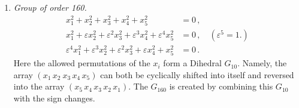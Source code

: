 \documentclass[leqno]{article}
\begin{document}
\begin{enumerate}[label=\arabic*)]
    \item \textit{Group of order 160.}
    \begin{align*}
    	x_1^2 + x_2^2 + x_3^2 + x_4^2 + x_5^2 &= 0 \, , \\
    	x_1^2 + \varepsilon x_2^2 + \varepsilon^2 x_3^2 + \varepsilon^3 x_4^2 + \varepsilon^4 x_5^2 &= 0 \, , \quad (\varepsilon^5=1.) \\
    	\varepsilon^4 x_1^2 + \varepsilon^3 x_2^2 + \varepsilon^2 x_3^2 + \varepsilon x_4^2 + x_5^2 &=0 \, . 
    \end{align*}
    Here the allowed permutations of the $x_i$ form a Dihedral $G_{10}$. Namely, the array $(x_1 \, x_2 \ x_3 \, x_4 \, x_5)$ can both be cyclically shifted into itself and reversed into the array $(x_5 \, x_4 \, x_3 \, x_2 \, x_1)$. The $G_{160}$ is created by combining this $G_{10}$ with the sign changes.
\end{enumerate}

\end{document}
